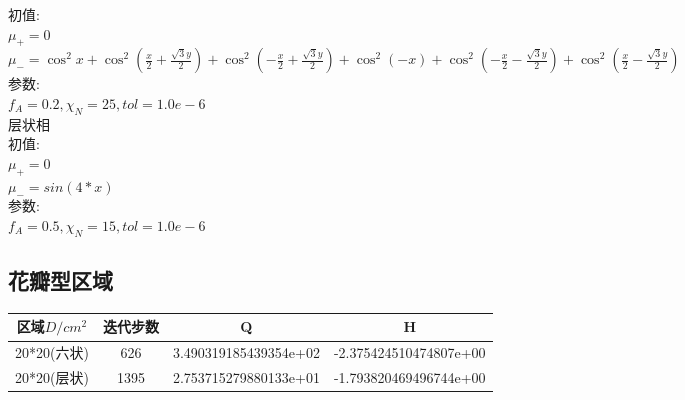 \documentclass[12pt]{article}
\begin{document}
\begin{CJK}{UTF8}{gkai}
初值:\\

$ \mu_+=0 $\\

$ \mu_-=\cos^{2}x+\cos^2 (\frac{x}{2}+\frac{\sqrt{3}y}{2})+\cos^2(-\frac{x}{2}+\frac{\sqrt{3}y}{2})+\cos^{2}(-x)+\cos^2 (-\frac{x}{2}-\frac{\sqrt{3}y}{2})+\cos^2 (\frac{x}{2}-\frac{\sqrt{3}y}{2})$\\

参数:\\

$f_A=0.2,\chi_N=25,tol=1.0e-6$\\

层状相\\

初值:\\

$ \mu_+=0 $\\

$ \mu_-=sin(4*x)$\\

参数:\\

$f_A=0.5,\chi_N=15,tol=1.0e-6$\\ 

\subsection{花瓣型区域}   
\begin{table}[H]
	\centering
	\begin{tabular}{cccc}
		\toprule
		区域$D/cm^2$ &	迭代步数 & Q &  H \\
		\midrule
		20*20(六状)&626& 3.490319185439354e+02 & -2.375424510474807e+00\\
		20*20(层状)&1395 &2.753715279880133e+01 &-1.793820469496744e+00\\
		\bottomrule
	\end{tabular}
\end{table}


\end{CJK}
\end{document}
